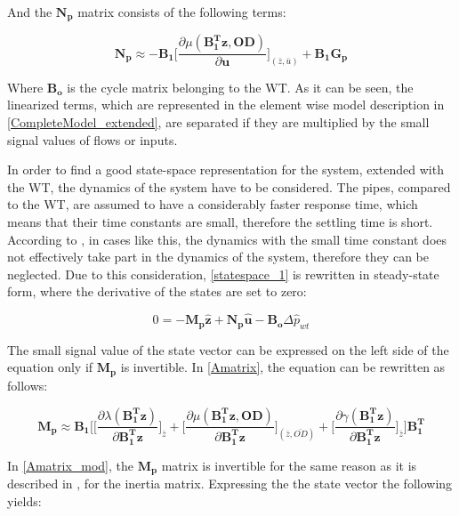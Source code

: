 And the $\bm{N_p}$ matrix consists of the following terms:

\begin{equation}
  \bm{N_p} \approx -\bm{B_1} \bigg[ \frac{\partial{\mu(\bm{{B_1^{T}}}\bm{z}, \bm{OD})}}{{\partial{\bm{u}}}}  \bigg]_{(\bar{z}, \bar{u})} + \bm{B_1}\bm{G_p}  
\label{Bumatrix}
\end{equation}

Where $\bm{B_o}$ is the cycle matrix belonging to the WT. As it can be seen, the linearized terms, which are represented in the element wise model description in \eqref{CompleteModel_extended}, are separated if they are multiplied by the small signal values of flows or inputs. 

In order to find a good state-space representation for the system, extended with the WT, the dynamics of the system have to be considered. The pipes, compared to the WT, are assumed to have a considerably faster response time, which means that their time constants are small, therefore the settling time is short. According to \citep{franklin1994feedback}, in cases like this, the dynamics with the small time constant does not effectively take part in the dynamics of the system, therefore they can be neglected. Due to this consideration, \eqref{statespace_1} is rewritten in steady-state form, where the derivative of the states are set to zero:

\begin{equation}
 0 = -\bm{M_p} \bm{\hat{z}} + \bm{N_p} \bm{\hat{u}} -\bm{B_o} \Delta \hat{p}_{wt}    
 \label{statespace_2}
\end{equation}

The small signal value of the state vector can be expressed on the left side of the equation only if $\bm{M_p}$ is invertible. In \eqref{Amatrix}, the equation can be rewritten as follows: 

\begin{equation}
  \bm{M_p} \approx \bm{B_1}\Bigg[ \bigg[ \frac{\partial{\lambda(\bm{{B_1^{T}}}\bm{z})}}{{\partial{\bm{{B_1^{T}}}\bm{z}}}}   \bigg]_{\bar{z}} +
\bigg[ \frac{\partial{\mu(\bm{{B_1^{T}}}\bm{z}, \bm{OD})}}{{\partial{\bm{{B_1^{T}}}\bm{z}}}}  \bigg]_{(\bar{z}, \bar{OD})} +  \bigg[ \frac{\partial{\gamma(\bm{{B_1^{T}}}\bm{z})}}{{\partial{\bm{{B_1^{T}}}\bm{z}}}}   \bigg]_{\bar{z}}\Bigg] \bm{{B_1^{T}}}
\label{Amatrix_mod}
\end{equation}

In \eqref{Amatrix_mod}, the $\bm{M_p}$ matrix is invertible for the same reason as it is described in , for the inertia matrix.
Expressing the the state vector the following yields:

